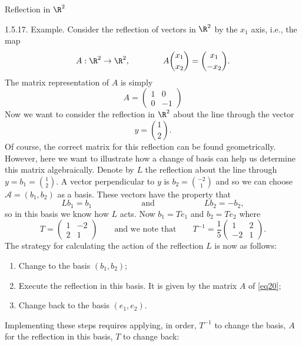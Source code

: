 \documentclass[smaller,hyperref={CJKbookmarks=true}]{beamer}
\begin{document}
\begin{frame}{Reflection in $\R^2$}
\begin{spacing}{1}
\alert{1.5.17. Example.} Consider the reflection of vectors in $\R^2$ by the $x_1$ axis, i.e., the map
\[A:\R^2\to\R^2,\qquad\qquad A\binom{x_1}{x_2}=\binom{x_1}{-x_2}.\]
The matrix representation of $A$ is simply
\begin{equation}\label{eq20}
  A=\begin{pmatrix}
      1 & 0 \\
      0 & -1
    \end{pmatrix}
\end{equation}
Now we want to consider the reflection in $\R^2$ about the line through the vector
\[y=\binom{1}{2}.\]
Of course, the correct matrix for this reflection can be found geometrically.
However, here we want to illustrate how a change of basis can help us
determine this matrix algebraically.
\newpage
Denote by $L$ the reflection about the line through $y=b_1=\binom{1}{2}$. A vector perpendicular to $y$ is $b_2=\binom{-2}{1}$ and so we can choose $\mathcal{A}=(b_1,b_2)$ as a basis. These vectors have the property that
\begin{equation*}
  Lb_1=b_1\qquad\qquad\qquad\text{and}\qquad\qquad\qquad
  Lb_2=-b_2,
\end{equation*}
so in this basis we know how $L$ acts. Now $b_1=Te_1$ and $b_2=Te_2$ where
\begin{equation*}
  T=\begin{pmatrix}
      1 & -2 \\
      2 & 1
    \end{pmatrix}\qquad\text{and we note that}\qquad T^{-1}=\frac{1}{5}\begin{pmatrix}
                        1 & 2 \\
                        -2 & 1
                      \end{pmatrix}.
\end{equation*}
The strategy for calculating the action of the reflection $L$ is now as follows:
\begin{enumerate}[1.]
  \item Change to the basis $(b_1,b_2)$;
  \item Execute the reflection in this basis. It is given by the matrix $A$ of \eqref{eq20};
  \item Change back to the basis $(e_1,e_2)$.
\end{enumerate}
\newpage
Implementing these steps requires applying, in order, $T^{-1}$ to change the basis, $A$ for the reflection in this basis, $T$ to change back:

\end{spacing}
\end{frame}
\end{document}
